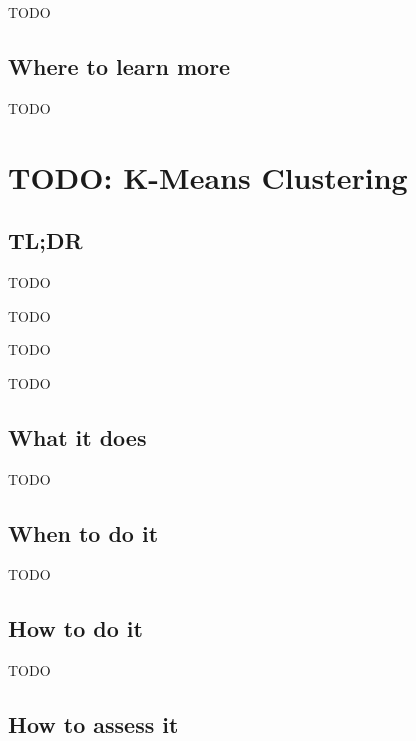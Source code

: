 \documentclass[
]{book}
\providecommand{\tightlist}{%
  \setlength{\itemsep}{0pt}\setlength{\parskip}{0pt}}
\begin{document}
TODO

\hypertarget{where-to-learn-more-20}{%
\section{Where to learn more}\label{where-to-learn-more-20}}

TODO

\hypertarget{k-means-clustering}{%
\chapter{TODO: K-Means Clustering}\label{k-means-clustering}}

\hypertarget{tldr-21}{%
\section{TL;DR}\label{tldr-21}}

\begin{description}
\tightlist
\item[What it does]
TODO
\item[When to do it]
TODO
\item[How to do it]
TODO
\item[How to assess it]
TODO
\end{description}

\hypertarget{what-it-does-21}{%
\section{What it does}\label{what-it-does-21}}

TODO

\hypertarget{when-to-do-it-21}{%
\section{When to do it}\label{when-to-do-it-21}}

TODO

\hypertarget{how-to-do-it-21}{%
\section{How to do it}\label{how-to-do-it-21}}

TODO

\hypertarget{how-to-assess-it-21}{%
\section{How to assess it}\label{how-to-assess-it-21}}
\end{document}
